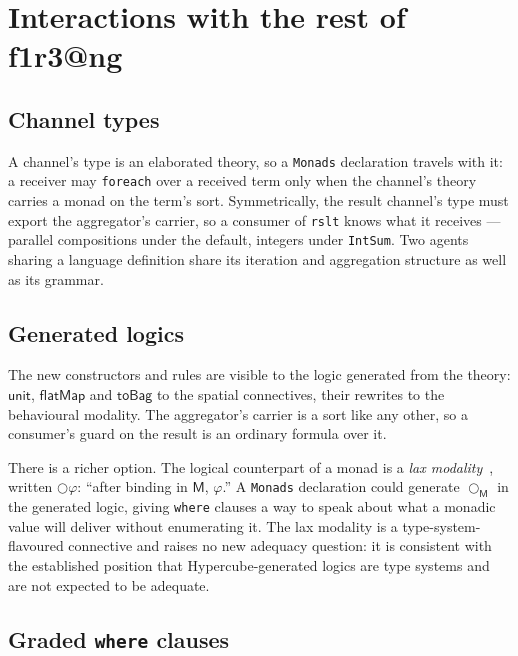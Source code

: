 \documentclass[11pt]{article}
\makeatletter
\theoremstyle{definition}
\theoremstyle{plain}
\theoremstyle{remark}
\newcommand{\M}{\mathsf{M}}
\newcommand{\unit}{\mathsf{unit}}
\newcommand{\bind}{\mathsf{flatMap}}
\newcommand{\lax}{\bigcirc}
\newcommand{\fe}{\texttt{foreach}}
\newcommand{\flang}{\textsf{f1r3\textbar @ng}}
\makeatother
\begin{document}
\section{Interactions with the rest of \flang{}}
\label{sec:interactions}

\subsection{Channel types}

A channel's type is an elaborated theory, so a \texttt{Monads} declaration
travels with it: a receiver may \fe{} over a received term only when the
channel's theory carries a monad on the term's sort. Symmetrically, the result
channel's type must export the aggregator's carrier, so a consumer of
\texttt{rslt} knows what it receives --- parallel compositions under the default,
integers under \texttt{IntSum}. Two agents sharing a language definition share
its iteration and aggregation structure as well as its grammar.

\subsection{Generated logics}
\label{sec:logic}

The new constructors and rules are visible to the logic generated from the
theory: \(\unit\), \(\bind\) and \(\mathsf{toBag}\) to the spatial connectives,
their rewrites to the behavioural modality. The aggregator's carrier is a sort
like any other, so a consumer's guard on the result is an ordinary formula over
it.

There is a richer option. The logical counterpart of a monad is a \emph{lax
modality}~\cite{FairtloughMendler97, BentonBiermanDePaiva98}, written
\(\lax\varphi\): ``after binding in \(\M\), \(\varphi\).'' A \texttt{Monads}
declaration could generate \(\lax_\M\) in the generated logic, giving
\texttt{where} clauses a way to speak about what a monadic value will deliver
without enumerating it. The lax modality is a type-system-flavoured connective
and raises no new adequacy question: it is consistent with the established
position that Hypercube-generated logics are type systems and are not expected
to be adequate.

\subsection{Graded \texttt{where} clauses}
\label{sec:graded}
\end{document}
